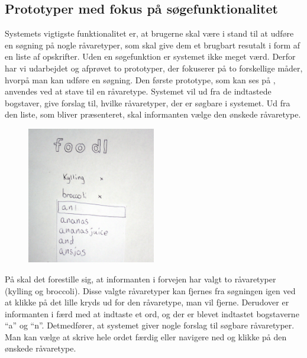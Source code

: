 \subsection{Prototyper med fokus på søgefunktionalitet}
\label{subsec:prototype1}

Systemets vigtigste funktionalitet er, at brugerne skal være i stand til at udføre en søgning på nogle råvaretyper, som skal give dem et brugbart resutalt i form af en liste af opskrifter. Uden en søgefunktion er systemet ikke meget værd. Derfor har vi udarbejdet og afprøvet to prototyper, der fokuserer på to forskellige måder, hvorpå man kan udføre en søgning. Den første prototype, som kan ses på , anvendes ved at stave til en råvaretype. Systemet vil ud fra de indtastede bogstaver, give forslag til, hvilke råvaretyper, der er søgbare i systemet. Ud fra den liste, som bliver præsenteret, skal informanten vælge den ønskede råvaretype.

\begin{figure}[H]
	\centering
	\includegraphics[width=0.5\textwidth]{billeder/prototyper/prototype1a.jpg}
	\label{fig:prototype1adesign}
\end{figure}

På  skal det forestille sig, at informanten i forvejen har valgt to råvaretyper (kylling og broccoli). Disse valgte råvaretyper kan fjernes fra søgningen igen ved at klikke på det lille kryds ud for den råvaretype, man vil fjerne. Derudover er informanten i færd med at indtaste et ord, og der er blevet indtastet bogstaverne ``a'' og ``n''. Detmedfører, at systemet giver nogle forslag til søgbare råvaretyper. Man kan vælge at skrive hele ordet færdig eller navigere ned og klikke på den ønskede råvaretype.


